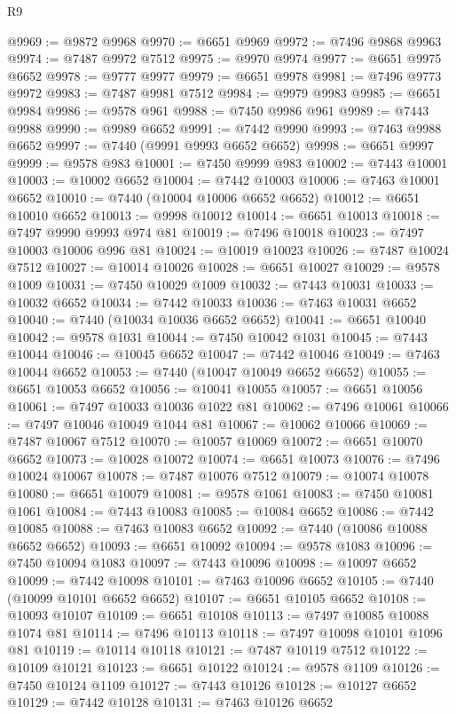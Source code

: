 \begin{lexlean}{R9}
\begin{coremodule}
@9969 := @9872 @9968
@9970 := @6651 @9969
@9972 := @7496 @9868 @9963
@9974 := @7487 @9972 @7512
@9975 := @9970 @9974
@9977 := @6651 @9975 @6652
@9978 := @9777 @9977
@9979 := @6651 @9978
@9981 := @7496 @9773 @9972
@9983 := @7487 @9981 @7512
@9984 := @9979 @9983
@9985 := @6651 @9984
@9986 := @9578 @961
@9988 := @7450 @9986 @961
@9989 := @7443 @9988
@9990 := @9989 @6652
@9991 := @7442 @9990
@9993 := @7463 @9988 @6652
@9997 := @7440 (@9991 @9993 @6652 @6652)
@9998 := @6651 @9997
@9999 := @9578 @983
@10001 := @7450 @9999 @983
@10002 := @7443 @10001
@10003 := @10002 @6652
@10004 := @7442 @10003
@10006 := @7463 @10001 @6652
@10010 := @7440 (@10004 @10006 @6652 @6652)
@10012 := @6651 @10010 @6652
@10013 := @9998 @10012
@10014 := @6651 @10013
@10018 := @7497 @9990 @9993 @974 @81
@10019 := @7496 @10018
@10023 := @7497 @10003 @10006 @996 @81
@10024 := @10019 @10023
@10026 := @7487 @10024 @7512
@10027 := @10014 @10026
@10028 := @6651 @10027
@10029 := @9578 @1009
@10031 := @7450 @10029 @1009
@10032 := @7443 @10031
@10033 := @10032 @6652
@10034 := @7442 @10033
@10036 := @7463 @10031 @6652
@10040 := @7440 (@10034 @10036 @6652 @6652)
@10041 := @6651 @10040
@10042 := @9578 @1031
@10044 := @7450 @10042 @1031
@10045 := @7443 @10044
@10046 := @10045 @6652
@10047 := @7442 @10046
@10049 := @7463 @10044 @6652
@10053 := @7440 (@10047 @10049 @6652 @6652)
@10055 := @6651 @10053 @6652
@10056 := @10041 @10055
@10057 := @6651 @10056
@10061 := @7497 @10033 @10036 @1022 @81
@10062 := @7496 @10061
@10066 := @7497 @10046 @10049 @1044 @81
@10067 := @10062 @10066
@10069 := @7487 @10067 @7512
@10070 := @10057 @10069
@10072 := @6651 @10070 @6652
@10073 := @10028 @10072
@10074 := @6651 @10073
@10076 := @7496 @10024 @10067
@10078 := @7487 @10076 @7512
@10079 := @10074 @10078
@10080 := @6651 @10079
@10081 := @9578 @1061
@10083 := @7450 @10081 @1061
@10084 := @7443 @10083
@10085 := @10084 @6652
@10086 := @7442 @10085
@10088 := @7463 @10083 @6652
@10092 := @7440 (@10086 @10088 @6652 @6652)
@10093 := @6651 @10092
@10094 := @9578 @1083
@10096 := @7450 @10094 @1083
@10097 := @7443 @10096
@10098 := @10097 @6652
@10099 := @7442 @10098
@10101 := @7463 @10096 @6652
@10105 := @7440 (@10099 @10101 @6652 @6652)
@10107 := @6651 @10105 @6652
@10108 := @10093 @10107
@10109 := @6651 @10108
@10113 := @7497 @10085 @10088 @1074 @81
@10114 := @7496 @10113
@10118 := @7497 @10098 @10101 @1096 @81
@10119 := @10114 @10118
@10121 := @7487 @10119 @7512
@10122 := @10109 @10121
@10123 := @6651 @10122
@10124 := @9578 @1109
@10126 := @7450 @10124 @1109
@10127 := @7443 @10126
@10128 := @10127 @6652
@10129 := @7442 @10128
@10131 := @7463 @10126 @6652

\end{coremodule}
\end{lexlean}
